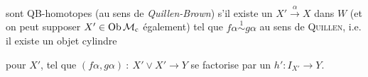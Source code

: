 \begin{description}[leftmargin=9em, labelwidth=8em, font=\normalfont]
\item[$f,g : X \rightrightarrows Y$] sont QB-homotopes (au sens de \textit{Quillen-Brown}) s'il existe un $X' \xrightarrow{\alpha} X$ dans $W$ (et on peut supposer $X' \in \mathrm{Ob}\,\mathcal{M}_{\mathrm{c}}$ également) tel que $f\alpha \overset{1}{\sim} g\alpha$ au sens de \textsc{Quillen}, i.e. il existe un objet cylindre
pour $X'$, tel que $(f\alpha, g\alpha)\ :\ X' \vee X' \longrightarrow Y$ se factorise par un $h' : I_{X'} \longrightarrow Y$.
\end{description}

